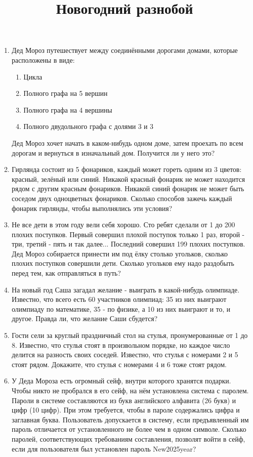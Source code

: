\documentclass[a4paper,12pt]{article}
\title{Новогодний разнобой}
\begin{document}
\maketitle
    \begin{enumerate}
        \item Дед Мороз путешествует между соединёнными дорогами домами, которые расположены в виде:
        \begin{enumerate}
            \item Цикла
            \item Полного графа на 5 вершин
            \item Полного графа на 4 вершины
            \item Полного двудольного графа с долями 3 и 3
        \end{enumerate}
        Дед Мороз хочет начать в каком-нибудь одном доме, затем проехать по всем дорогам и вернуться в изначальный дом. Получится ли у него это?
        \item Гирлянда состоит из 5 фонариков, каждый может гореть одним из 3 цветов: красный, зелёный или синий. Никакой красный фонарик не может находится рядом с другим красным фонариков. Никакой синий фонарик не может быть соседом двух одноцветных фонариков. Сколько способов зажечь каждый фонарик гирлянды, чтобы выполнялись эти условия?
        \item Не все дети в этом году вели себя хорошо. Сто ребят сделали от 1 до 200 плохих поступков. Первый совершил плохой поступок только 1 раз, второй - три, третий - пять и так далее... Последний совершил 199 плохих поступков. Дед Мороз собирается принести им под ёлку столько угольков, сколько плохих поступков совершили дети. Сколько угольков ему надо раздобыть перед тем, как отправляться в путь?
        \item На новый год Саша загадал желание - выиграть в какой-нибудь олимпиаде. Известно, что всего есть 60 участников олимпиад: 35 из них выиграют олимпиаду по математике, 35 - по физике, а 10 из них выиграют и то, и другое. Правда ли, что желание Саши сбудется? 
        \item Гости сели за круглый праздничный стол на стулья, пронумерованные от 1 до 8. Известно, что стулья стоят в произвольном порядке, но каждое число делится на разность своих соседей. Известно, что стулья с номерами 2 и 5 стоят рядом. Докажите, что стулья с номерами 4 и 6 тоже стоят рядом.
        \item У Деда Мороза есть огромный сейф, внутри которого хранятся подарки. Чтобы никто не пробрался в его сейф, на нём установлена система с паролем. Пароли в системе составляются из букв английского алфавита (26 букв) и цифр (10 цифр). При этом требуется, чтобы в пароле содержались цифра и заглавная буква. Пользователь допускается в систему, если предъявленный им пароль отличается от установленного не более чем в одном символе. Сколько паролей, соответствующих требованиям составления, позволят войти в сейф, если для пользователя был установлен пароль New2025year?

\end{enumerate}
\end{document}
